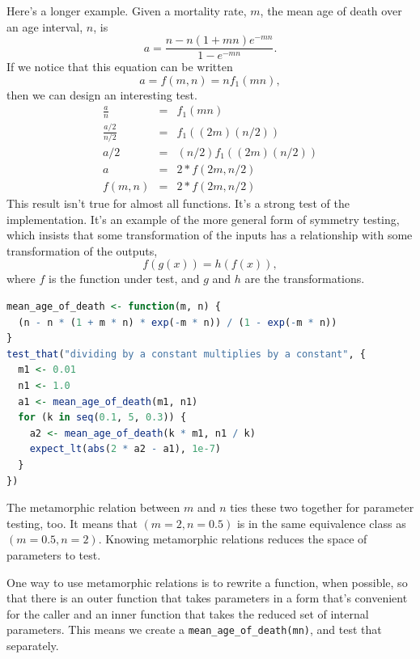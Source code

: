 \documentclass[fleqn,10pt]{olplainarticle}
\begin{document}
Here's a longer example. Given a mortality rate, $m$, the
mean age of death over an age interval, $n$, is
\begin{equation}
    a = \frac{n - n(1+m n)e^{-m n}}{1 - e^{-m n}}.
\end{equation}
If we notice that this equation can be written
\begin{equation}
    a = f(m, n) = n  f_1(m  n),
\end{equation}
then we can design an interesting test.
\begin{eqnarray}
    \frac{a}{n} &= &f_1(m  n) \\
    \frac{a/2}{n/2} &= & f_1((2  m)  (n / 2)) \\
    a /2 &= & (n/2) f_1((2  m)  (n / 2)) \\
    a &= &2 * f(2m, n/2) \\
    f(m, n) & =& 2 * f(2m, n/2)
\end{eqnarray}
This result isn't true for almost all functions. It's a strong test
of the implementation. It's an example of the more general
form of symmetry testing, which insists that some transformation
of the inputs has a relationship with some transformation of the 
outputs,
\begin{equation}
    f(g(x)) = h(f(x)),
\end{equation}
where $f$ is the function under test, and $g$ and $h$ are the transformations.

\begin{lstlisting}[language=R]
mean_age_of_death <- function(m, n) {
  (n - n * (1 + m * n) * exp(-m * n)) / (1 - exp(-m * n))
}
test_that("dividing by a constant multiplies by a constant", {
  m1 <- 0.01
  n1 <- 1.0
  a1 <- mean_age_of_death(m1, n1)
  for (k in seq(0.1, 5, 0.3)) {
    a2 <- mean_age_of_death(k * m1, n1 / k)
    expect_lt(abs(2 * a2 - a1), 1e-7)
  }
})
\end{lstlisting}

The metamorphic relation between $m$ and $n$ ties these two together
for parameter testing, too. It means that $(m=2, n=0.5)$ is in the same
equivalence class as $(m=0.5, n=2).$ Knowing
metamorphic relations reduces the space of parameters to test.

One way to use metamorphic relations is to rewrite a function, when possible,
so that there is an outer function that takes parameters in a form that's
convenient for the caller and an inner function that takes the reduced
set of internal parameters. This means we create a
\lstinline|mean_age_of_death(mn)|, and test that separately.
\end{document}
